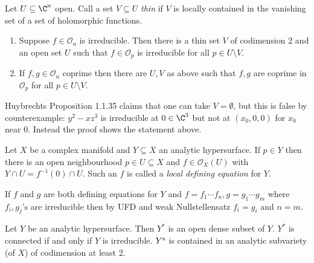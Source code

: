 \documentclass[a4paper]{article}
\begin{document}
\begin{definition}[thin]
  Let \(U \subseteq \C^n\) open. Call a set \(V \subseteq U\) \emph{thin} if \(V\) is locally contained in the vanishing set of a set of holomorphic functions.
\end{definition}

\begin{theorem}\leavevmode
  \label{thm:thin set}
  \begin{enumerate}
  \item Suppose \(f \in \mathcal O_n\) is irreducible. Then there is a thin set \(V\) of codimension \(2\) and an open set \(U\) such that \(f \in \mathcal O_p\) is irreducible for all \(p \in U \setminus V\).
  \item If \(f, g \in \mathcal O_n\) coprime then there are \(U, V\) as above such that \(f, g\) are coprime in \(\mathcal O_p\) for all \(p \in U \setminus V\).
  \end{enumerate}
\end{theorem}

\begin{remark}
  Huybrechts Proposition 1.1.35 claims that one can take \(V = \emptyset\), but this is false by counterexample: \(y^2 - xz^3\) is irreducible at \(0 \in \C^3\) but not at \((x_0, 0, 0)\) for \(x_0\) near \(0\). Instead the proof shows the statement above.
\end{remark}

\begin{definition}
  Let \(X\) be a complex manifold and \(Y \subseteq X\) an analytic hypersurface. If \(p \in Y\) then there is an open neighbourhood \(p \in U \subseteq X\) and \(f \in \mathcal O_X(U)\) with \(Y \cap U = f^{-1}(0) \cap U\). Such an \(f\) is called a \emph{local defining equation} for \(Y\).
\end{definition}

If \(f\) and \(g\) are both defining equations for \(Y\) and \(f = f_1 \cdots f_n, g = g_1 \cdots g_m\) where \(f_i, g_j\)'s are irreducible then by UFD and weak Nullstellensatz \(f_i = g_i\) and \(n = m\).

\begin{theorem}
  Let \(Y\) be an analytic hypersurface. Then \(Y^*\) is an open dense subset of \(Y\). \(Y^*\) is connected if and only if \(Y\) is irreducible. \(Y^{\text s}\) is contained in an analytic subvariety (of \(X\)) of codimension at least 2.
\end{theorem}
\end{document}
